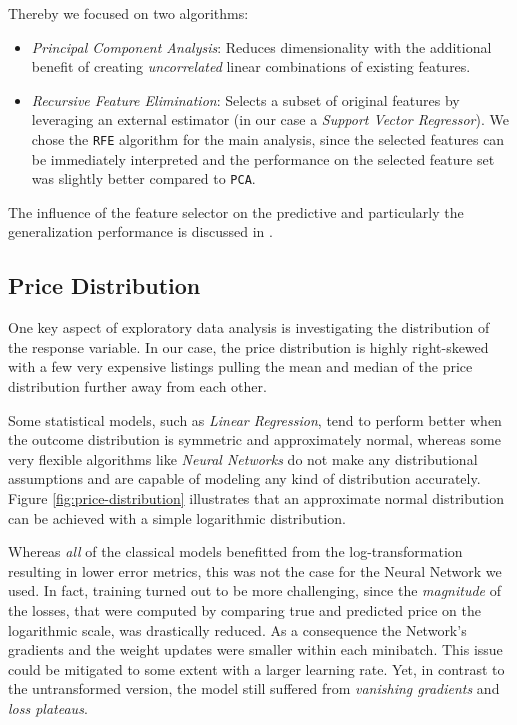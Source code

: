 Thereby we focused on two algorithms:
\begin{itemize}
  \item \emph{Principal Component Analysis}:
        Reduces dimensionality with the additional benefit of creating \emph{uncorrelated} linear combinations of existing features.
  \item \emph{Recursive Feature Elimination}:
        Selects a subset of original features by leveraging an external estimator (in our case a \emph{Support Vector Regressor}).
        We chose the \texttt{RFE} algorithm for the main analysis, since the selected features can be immediately interpreted and the performance on the selected feature set was slightly better compared to \texttt{PCA}.

\end{itemize}

The influence of the feature selector on the predictive and particularly the generalization performance is discussed in .

\subsection{Price Distribution} \label{appendix:price-distribution}

One key aspect of exploratory data analysis is investigating the distribution of the response variable.
In our case, the price distribution is highly right-skewed with a few very expensive listings pulling the mean and median of the price distribution further away from each other.

Some statistical models, such as \emph{Linear Regression}, tend to perform better when the outcome distribution is symmetric and approximately normal, whereas some very flexible algorithms like \emph{Neural Networks} do not make any distributional assumptions and are capable of modeling any kind of distribution accurately.
Figure \ref{fig:price-distribution} illustrates that an approximate normal distribution can be achieved with a simple logarithmic distribution.

Whereas \emph{all} of the classical models benefitted from the log-transformation resulting in lower error metrics, this was not the case for the Neural Network we used.
In fact, training turned out to be more challenging, since the \emph{magnitude} of the losses, that were computed by comparing true and predicted price on the logarithmic scale, was drastically reduced.
As a consequence the Network's gradients and the weight updates were smaller within each minibatch.
This issue could be mitigated to some extent with a larger learning rate.
Yet, in contrast to the untransformed version, the model still suffered from \emph{vanishing gradients} and \emph{loss plateaus}.


